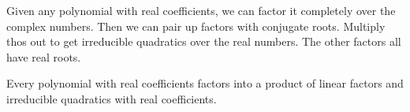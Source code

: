 \documentclass{ximera}
\begin{document}
Given any polynomial with real coefficients, we can factor it completely over the complex numbers.  Then we can pair up factors with conjugate roots. Multiply thos out to get irreducible quadratics over the real numbers.  The other factors all have real roots.





\begin{theorem}  

Every polynomial with real coefficients factors into a product of linear factors and irreducible quadratics with real coefficients.



\end{theorem}
\end{document}
